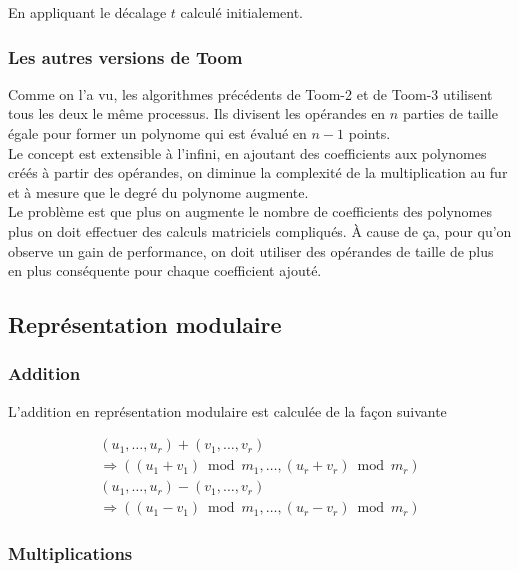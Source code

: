 \documentclass[letterpaper]{article}
\begin{document}
En appliquant le décalage $t$ calculé initialement.

\subsubsection{Les autres versions de Toom}

Comme on l'a vu, les algorithmes précédents de Toom-2 et de Toom-3 utilisent
tous les deux le même processus. Ils divisent les opérandes en $n$ parties
de taille égale pour former un polynome qui est évalué en $n - 1$
points.\\
Le concept est extensible à l'infini, en ajoutant des coefficients aux
polynomes créés à partir des opérandes, on diminue la complexité de la
multiplication au fur et à mesure que le degré du polynome augmente.\\
Le problème est que plus on augmente le nombre de coefficients des polynomes
plus on doit effectuer des calculs matriciels compliqués. À cause de ça, pour
qu'on observe un gain de performance, on doit utiliser des opérandes de taille
de plus en plus conséquente pour chaque coefficient ajouté.

\subsection{Représentation modulaire}

\subsubsection{Addition}

L'addition en représentation modulaire est calculée de la façon suivante

\begin{equation}
  \begin{split}
    (u_1, \dots, u_r) + (v_1, \dots, v_r) \\
     \Rightarrow ((u_1 + v_1) \bmod m_1, \dots, (u_r + v_r) \bmod m_r)
  \end{split}
\end{equation}
\begin{equation}
  \begin{split}
    (u_1, \dots, u_r) - (v_1, \dots, v_r) \\
      \Rightarrow ((u_1 - v_1) \bmod m_1, \dots, (u_r - v_r) \bmod m_r)
  \end{split}
\end{equation}

\subsubsection{Multiplications}
\end{document}
